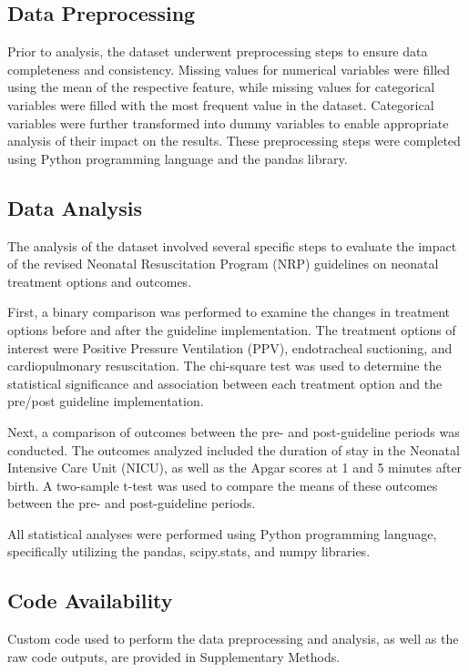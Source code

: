 \documentclass[11pt]{article}
\begin{document}
\subsection*{Data Preprocessing}
Prior to analysis, the dataset underwent preprocessing steps to ensure data completeness and consistency. Missing values for numerical variables were filled using the mean of the respective feature, while missing values for categorical variables were filled with the most frequent value in the dataset. Categorical variables were further transformed into dummy variables to enable appropriate analysis of their impact on the results. These preprocessing steps were completed using Python programming language and the pandas library.

\subsection*{Data Analysis}
The analysis of the dataset involved several specific steps to evaluate the impact of the revised Neonatal Resuscitation Program (NRP) guidelines on neonatal treatment options and outcomes.

First, a binary comparison was performed to examine the changes in treatment options before and after the guideline implementation. The treatment options of interest were Positive Pressure Ventilation (PPV), endotracheal suctioning, and cardiopulmonary resuscitation. The chi-square test was used to determine the statistical significance and association between each treatment option and the pre/post guideline implementation.

Next, a comparison of outcomes between the pre- and post-guideline periods was conducted. The outcomes analyzed included the duration of stay in the Neonatal Intensive Care Unit (NICU), as well as the Apgar scores at 1 and 5 minutes after birth. A two-sample t-test was used to compare the means of these outcomes between the pre- and post-guideline periods.

All statistical analyses were performed using Python programming language, specifically utilizing the pandas, scipy.stats, and numpy libraries.\subsection*{Code Availability}

Custom code used to perform the data preprocessing and analysis, as well as the raw code outputs, are provided in Supplementary Methods.
\end{document}

